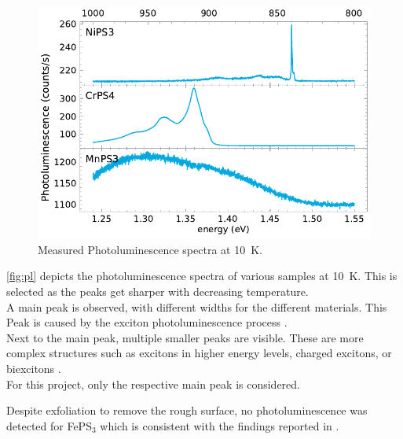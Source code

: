 \documentclass[
	twoside,
	parskip=half,
	a4paper,
]{scrbook}
\begin{document}
\begin{figure}
	\centering
	\includegraphics{../figures/2023-12-10 Combined PL.pdf}
	\caption{Measured Photoluminescence spectra at \SI{10}{K}.}
	\label{fig:pl}
\end{figure}
\autoref{fig:pl} depicts the photoluminescence spectra of various samples at \SI{10}{K}.
This is selected as the peaks get sharper with decreasing temperature.\\
A main peak is observed, with different widths for the different materials. 
This Peak is caused by the exciton photoluminescence process \cite{NiPS3_exciton,CrPS4_pl}.\\
Next to the main peak, multiple smaller peaks are visible.
These are more complex structures such as excitons in higher energy levels, charged excitons, or biexcitons \cite{CrPS4_pl, NiPS3_exciton,NiPS3_anisotropic, NiPS3_coherent}.\\
For this project, only the respective main peak is considered.

Despite exfoliation to remove the rough surface, no photoluminescence was detected for FePS$_3$ which is consistent with the findings reported in \cite{FePS3_pl}.
\end{document}
